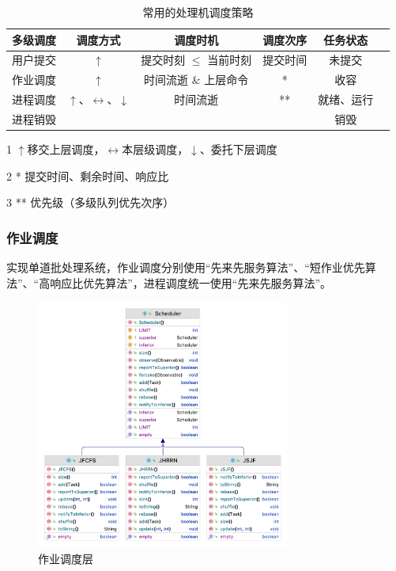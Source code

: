 \documentclass[UTF8]{ctexart}
\begin{document}
\begin{table}[htbp]
    \caption{常用的处理机调度策略}
    \centering

    \begin{threeparttable}
        \begin{tabular}{cccccc}
            \toprule
            多级调度 & 调度方式                                      & 调度时机             & 调度次序 & 任务状态  \\
            \midrule
            用户提交 & $\uparrow$                                & 提交时刻 $\leq$ 当前时刻 & 提交时间 & 未提交   \\
            作业调度 & $\uparrow$                                & 时间流逝 \& 上层命令     & *    & 收容    \\
            进程调度 & $\uparrow$、$\leftrightarrow$、$\downarrow$ & 时间流逝             & **   & 就绪、运行 \\
            进程销毁 &                                           &                  &      & 销毁    \\
            \bottomrule
        \end{tabular}

        \begin{tablenotes}
            \item [1]   $\uparrow$移交上层调度，$\leftrightarrow$本层级调度，$\downarrow$、委托下层调度
            \item [2]   * 提交时间、剩余时间、响应比
            \item [3]   ** 优先级（多级队列优先次序）
        \end{tablenotes}

    \end{threeparttable}
    \qquad
\end{table}

\subsubsection{作业调度}
实现单道批处理系统，作业调度分别使用“先来先服务算法”、“短作业优先算法”、“高响应比优先算法”，进程调度统一使用“先来先服务算法”。

\begin{figure}[htbp]
    \centering
    \includegraphics[height=232.5pt]{t1-class.png}
    \caption{作业调度层}
\end{figure}
\end{document}
